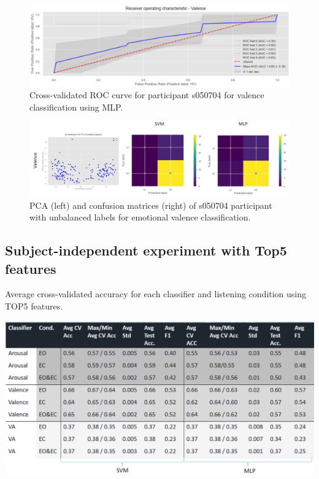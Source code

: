 \begin{figure}[!htb]
\includegraphics[width=16cm]{img/appendix/valence_unbalanced_roc_mlp.png}
\centering
\caption{Cross-validated ROC curve for participant s050704 for valence classification using MLP.}\label{fig:valence_unbalanced_roc_mlp}
\end{figure}

\begin{figure}[!htb]
\includegraphics[width=16cm]{img/appendix/valence_unbalanced_pca_confusion.png}
\centering
\caption{PCA (left) and confusion matrices (right) of s050704 participant with unbalanced labels for emotional valence 
classification.}\label{fig:valence_unbalanced_pca_confusion}
\end{figure}

\subsection{Subject-independent experiment with Top5 features}
\label{sec:appendix_A3.4}
\begin{table}[h!]
  \caption{ Average cross-validated accuracy for each classifier and listening condition using TOP5 features.}
  \label{tbl:top5_cv_si_experiment}
  \includegraphics[width=\linewidth]{img/appendix/top5_cv_si_experiment.png}
\end{table}

